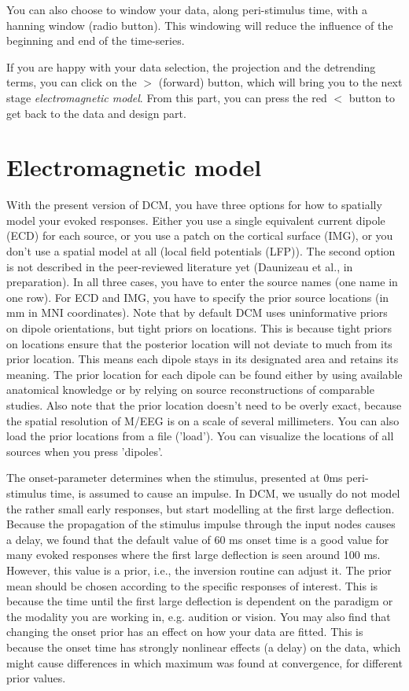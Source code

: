 You can also choose to window your data, along peri-stimulus time,
with a hanning window (radio button). This windowing will reduce the
influence of the beginning and end of the time-series.

If you are happy with your data selection, the projection and the detrending
terms, you can click on the $>$ (forward) button, which will bring you to
the next stage \textit{electromagnetic model}. From this part, you can
press the red $<$ button to get back to the data and design part.

\section{Electromagnetic model}
With the present version of DCM, you have three options for how to spatially
model your evoked responses. Either you use a single equivalent
current dipole (ECD) for each source, or you use a patch on the
cortical surface (IMG), or you don't use a spatial model at all (local field potentials (LFP)). The second option is not
described in the peer-reviewed literature yet (Daunizeau et al., in
preparation). In all three cases, you have to enter the source names (one
name in one row). For ECD and IMG, you have to specify the prior source locations (in mm in MNI
coordinates). Note that by default DCM uses  uninformative priors on
dipole orientations, but tight priors on locations. This is because tight priors on locations ensure that the posterior location will not deviate to much from its prior location. This means each dipole stays in its designated area and retains its meaning. The prior location for each
dipole can be found either by using available anatomical knowledge or
by relying on source reconstructions of comparable studies. Also note
that the prior location doesn't need to be overly exact, because the
spatial resolution of M/EEG is on a scale of several millimeters.
You can also load the prior locations from a file
('load'). You can visualize the locations of all sources when you
press 'dipoles'.

The onset-parameter determines when the stimulus,
presented at 0ms peri-stimulus time, is assumed to cause an
impulse. In DCM, we usually do not model the rather small early responses, but start modelling at the first large
deflection. Because the propagation of the stimulus impulse through
the input nodes causes a delay, we found that the default value of 60
ms onset time is a good value for many evoked responses where the
first large deflection is seen around 100 ms. However, this value is a
prior, i.e., the inversion routine can adjust it. The prior mean should be chosen according to the specific responses of interest. This is because the time until the first large deflection is dependent on the paradigm or the modality you are working in, e.g. audition or vision.
You may also find that changing the onset prior has an effect on how your data are
fitted. This is because the onset time has strongly nonlinear effects
(a delay) on the data, which might cause differences in which maximum
was found at convergence, for different prior values.

